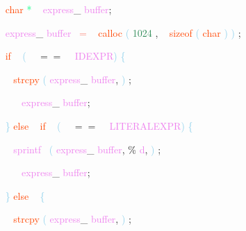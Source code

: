 \documentclass[8, usernames, dvipsnames]{beamer}
\begin{document}
\begin{frame}
\textcolor{White}{\   }
\textcolor{OrangeRed}{char}
\textcolor{SpringGreen}{*}
\textcolor{White}{\ }
\textcolor{Violet}{express}\textcolor{Sepia}{\_}
\textcolor{Violet}{buffer}\textcolor{Sepia}{;}

 \textcolor{White}{\   }
\textcolor{Violet}{express}\textcolor{Sepia}{\_}
\textcolor{Violet}{buffer}\textcolor{White}{\ }
\textcolor{Salmon}{=}
\textcolor{White}{\ }
\textcolor{OrangeRed}{calloc}
\textcolor{SkyBlue}{(}
\textcolor{SeaGreen}{1024}
\textcolor{Sepia}{,}
\textcolor{White}{\ }
\textcolor{OrangeRed}{sizeof}
\textcolor{SkyBlue}{(}
\textcolor{OrangeRed}{char}
\textcolor{SkyBlue}{)}
\textcolor{SkyBlue}{)}
\textcolor{Sepia}{;}

 \textcolor{White}{\   }
\textcolor{OrangeRed}{if}
\textcolor{White}{\ }
\textcolor{SkyBlue}{(}
\textcolor{White}{\ }
\textcolor{OliveGreen}{$==$}
\textcolor{White}{\ }
\textcolor{Violet}{IDEXPR}\textcolor{SkyBlue}{)}
\textcolor{SkyBlue}{\{ }

 \textcolor{White}{\   }
\textcolor{White}{\   }
\textcolor{OrangeRed}{strcpy}
\textcolor{SkyBlue}{(}
\textcolor{Violet}{express}\textcolor{Sepia}{\_}
\textcolor{Violet}{buffer}\textcolor{Sepia}{,}
\textcolor{SkyBlue}{)}
\textcolor{Sepia}{;}

 \textcolor{White}{\   }
\textcolor{White}{\   }
\textcolor{OrangeRed}{	}
\textcolor{White}{\ }
\textcolor{Violet}{express}\textcolor{Sepia}{\_}
\textcolor{Violet}{buffer}\textcolor{Sepia}{;}

 \textcolor{White}{\   }
\textcolor{SkyBlue}{\} }
\textcolor{OrangeRed}{else}
\textcolor{White}{\ }
\textcolor{OrangeRed}{if}
\textcolor{White}{\ }
\textcolor{SkyBlue}{(}
\textcolor{White}{\ }
\textcolor{OliveGreen}{$==$}
\textcolor{White}{\ }
\textcolor{Violet}{LITERALEXPR}\textcolor{SkyBlue}{)}
\textcolor{SkyBlue}{\{ }

 \textcolor{White}{\   }
\textcolor{White}{\   }
\textcolor{Violet}{sprintf}\textcolor{White}{\ }
\textcolor{SkyBlue}{(}
\textcolor{Violet}{express}\textcolor{Sepia}{\_}
\textcolor{Violet}{buffer}\textcolor{Sepia}{,}
\textcolor{Apricot}{\%}
\textcolor{Violet}{d}\textcolor{Sepia}{,}
\textcolor{SkyBlue}{)}
\textcolor{Sepia}{;}

 \textcolor{White}{\   }
\textcolor{White}{\   }
\textcolor{OrangeRed}{	}
\textcolor{White}{\ }
\textcolor{Violet}{express}\textcolor{Sepia}{\_}
\textcolor{Violet}{buffer}\textcolor{Sepia}{;}

 \textcolor{White}{\   }
\textcolor{SkyBlue}{\} }
\textcolor{OrangeRed}{else}
\textcolor{White}{\ }
\textcolor{SkyBlue}{\{ }

 \textcolor{White}{\   }
\textcolor{White}{\   }
\textcolor{OrangeRed}{strcpy}
\textcolor{SkyBlue}{(}
\textcolor{Violet}{express}\textcolor{Sepia}{\_}
\textcolor{Violet}{buffer}\textcolor{Sepia}{,}
\textcolor{SkyBlue}{)}
\textcolor{Sepia}{;}

 \end{frame}
\end{document}
